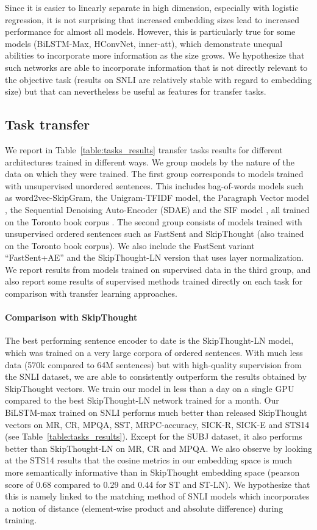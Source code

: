 \documentclass[11pt,letterpaper]{article}
\begin{document}
Since it is easier to linearly separate in high dimension, especially with logistic regression, it is not surprising that increased embedding sizes lead to increased performance for almost all models. However, this is particularly true for some models (BiLSTM-Max, HConvNet, inner-att), which demonstrate unequal abilities to incorporate more information as the size grows. We hypothesize that such networks are able to incorporate information that is not directly relevant to the objective task (results on SNLI are relatively stable with regard to embedding size) but that can nevertheless be useful as features for transfer tasks.

\subsection{Task transfer}
We report in Table~\ref{table:tasks_results} transfer tasks results for different architectures trained in different ways. We group models by the nature of the data on which they were trained. The first group corresponds to models trained with unsupervised unordered sentences. This includes bag-of-words models such as word2vec-SkipGram, the Unigram-TFIDF model, the Paragraph Vector model \cite{le2014distributed}, the Sequential Denoising Auto-Encoder (SDAE) \cite{hill2016learning} and the SIF model \cite{arora2016asimple}, all trained on the Toronto book corpus \cite{zhu2015aligning}. The second group consists of models trained with unsupervised ordered sentences such as FastSent and SkipThought (also trained on the Toronto book corpus). We also include the FastSent variant ``FastSent+AE'' and the SkipThought-LN version that uses layer normalization. We report results from models trained on supervised data in the third group, and also report some results of supervised methods trained directly on each task for comparison with transfer learning approaches.

\paragraph{Comparison with SkipThought}
The best performing sentence encoder to date is the SkipThought-LN model, which was trained on a very large corpora of ordered sentences. With much less data (570k compared to 64M sentences) but with high-quality supervision from the SNLI dataset, we are able to consistently outperform the results obtained by SkipThought vectors. We train our model in less than a day on a single GPU compared to the best SkipThought-LN network trained for a month. Our BiLSTM-max trained on SNLI performs much better than released SkipThought vectors on MR, CR, MPQA, SST, MRPC-accuracy, SICK-R, SICK-E and STS14 (see Table~\ref{table:tasks_results}). Except for the SUBJ dataset, it also performs better than SkipThought-LN on MR, CR and MPQA. We also observe by looking at the STS14 results that the cosine metrics in our embedding space is much more semantically informative than in SkipThought embedding space (pearson score of 0.68 compared to 0.29 and 0.44 for ST and ST-LN). We hypothesize that this is namely linked to the matching method of SNLI models which incorporates a notion of distance (element-wise product and absolute difference) during training.
\end{document}
